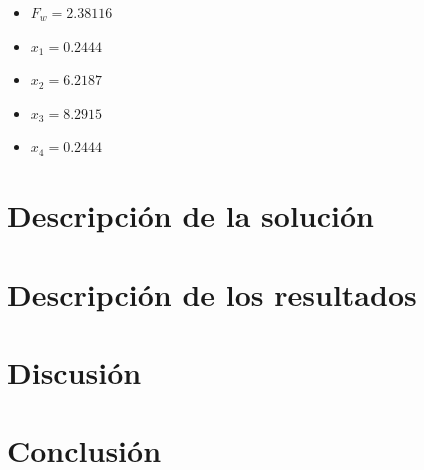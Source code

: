 \documentclass[a4paper, 12pt]{article}
\begin{document}
\begin{itemize}
    \item $F_w=2.38116$
    \item $x_1=0.2444$
    \item $x_2=6.2187$
    \item $x_3=8.2915$
    \item $x_4=0.2444$
\end{itemize}

\section{Descripción de la solución}

\section{Descripción de los resultados}

\section{Discusión}

\section{Conclusión}



\nocite{*}
\end{document}
